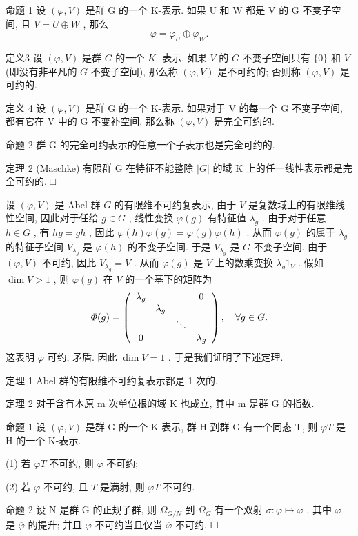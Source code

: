 \documentclass[]{article}
\begin{document}
命题 1 设 $(\varphi, V)$ 是群 G 的一个 K-表示. 如果 U 和 W 都是 V 的 G 不变子空间, 且 $V = U \oplus W$ , 那么 $$
\varphi = \varphi_ {U} \oplus \varphi_ {W}. 
$$

定义3 设 $(\varphi, V)$ 是群 $G$ 的一个 $K$ -表示. 如果 $V$ 的 $G$ 不变子空间只有 $\{0\}$ 和 $V$ (即没有非平凡的 $G$ 不变子空间), 那么称 $(\varphi, V)$ 是不可约的; 否则称 $(\varphi, V)$ 是可约的. 

定义 4 设 $(\varphi, V)$ 是群 G 的一个 K-表示. 如果对于 V 的每一个 G 不变子空间, 都有它在 V 中的 G 不变补空间, 那么称 $(\varphi, V)$ 是完全可约的. 

命题 2 群 G 的完全可约表示的任意一个子表示也是完全可约的. 

定理 2 (Maschke) 有限群 G 在特征不能整除 $|G|$ 的域 K 上的任一线性表示都是完全可约的. □ 

设 $(\varphi, V)$ 是 Abel 群 $G$ 的有限维不可约复表示, 由于 $V$ 是复数域上的有限维线性空间, 因此对于任给 $g \in G$ , 线性变换 $\varphi(g)$ 有特征值 $\lambda_g$ . 由于对于任意 $h \in G$ , 有 $hg = gh$ , 因此 $\varphi(h)\varphi(g) = \varphi(g)\varphi(h)$ . 从而 $\varphi(g)$ 的属于 $\lambda_g$ 的特征子空间 $V_{\lambda_g}$ 是 $\varphi(h)$ 的不变子空间. 于是 $V_{\lambda_g}$ 是 $G$ 不变子空间. 由于 $(\varphi, V)$ 不可约, 因此 $V_{\lambda_g} = V$ . 从而 $\varphi(g)$ 是 $V$ 上的数乘变换 $\lambda_g1_V$ . 假如 $\dim V > 1$ , 则 $\varphi(g)$ 在 $V$ 的一个基下的矩阵为 $$
\varPhi (g) = \left( \begin{array}{c c c c} \lambda_ {g} & & & 0 \\ & \lambda_ {g} & & \\ & & \ddots & \\ 0 & & & \lambda_ {g} \end{array} \right), \quad \forall g \in G.
$$这表明 $\varphi$ 可约, 矛盾. 因此 $\dim V = 1$ . 于是我们证明了下述定理. 

定理 1 Abel 群的有限维不可约复表示都是 1 次的. 

定理 2 对于含有本原 m 次单位根的域 K 也成立, 其中 m 是群 G 的指数. 

命题 1 设 $(\varphi, V)$ 是群 G 的一个 K-表示, 群 H 到群 G 有一个同态 T, 则 $\varphi T$ 是 H 的一个 K-表示. 

(1) 若 $\varphi T$ 不可约, 则 $\varphi$ 不可约; 

(2) 若 $\varphi$ 不可约, 且 $T$ 是满射, 则 $\varphi T$ 不可约. 

命题 2 设 N 是群 G 的正规子群, 则 $\Omega_{G/N}$ 到 $\Omega_{G}$ 有一个双射 $\sigma: \overline{\varphi} \mapsto \varphi$ , 其中 $\varphi$ 是 $\overline{\varphi}$ 的提升; 并且 $\varphi$ 不可约当且仅当 $\overline{\varphi}$ 不可约. ☐ 
\end{document}
